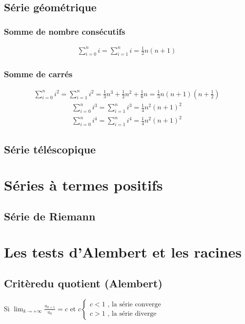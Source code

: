 \subsection{Série géométrique}
\subsubsection{Somme de nombre consécutifs}
\begin{eqnarray}
	\sum_{i=0}^{n}i=\sum_{i=1}^ni=\frac{1}{2}n(n+1)
\end{eqnarray}
\subsubsection{Somme de carrés}
\begin{eqnarray}
	\sum_{i=0}^{n}i^2=\sum_{i=1}^ni^2=\frac{1}{3}n^3+\frac{1}{2}n^2+\frac{1}{6}n=\frac{1}{3}n\left(n+1\right)\left(n+\frac{1}{2}\right)
\end{eqnarray}
\begin{eqnarray}
	\sum_{i=0}^{n}i^3=\sum_{i=1}^ni^3=\frac{1}{4}n^2\left(n+1\right)^2
\end{eqnarray}
\begin{eqnarray}
	\sum_{i=0}^{n}i^4=\sum_{i=1}^ni^4=\frac{1}{4}n^2\left(n+1\right)^2
\end{eqnarray}
\subsection{Série téléscopique}
\section{Séries à termes positifs}
\subsection{Série de Riemann}
\section{Les tests d'Alembert et les racines}
\subsection{Critèredu quotient (Alembert)}
Si $\lim_{k\rightarrow+\infty}\frac{u_{k+1}}{u_k}=c$ et $c \begin{cases}
	c<1 \text{ , la série converge}\\c>1 \text{ , la série diverge}
\end{cases}$

